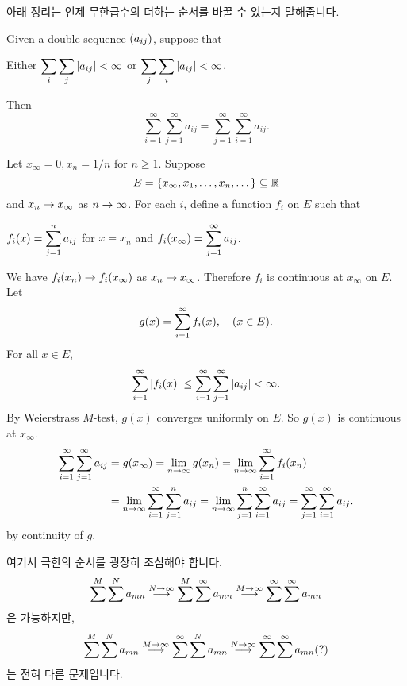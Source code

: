 \pagebreak

아래 정리는 언제 무한급수의 더하는 순서를 바꿀 수 있는지 말해줍니다.

  Given a double sequence \(\left( a_{ij} \right)\), suppose that
\begin{center}
    Either \(\displaystyle \sum_{i} \sum_{j} \left| a_{ij} \right| < \infty\) or \(\displaystyle \sum_{j} \sum_{i} \left| a_{ij} \right| < \infty\).
\end{center}
Then
\[
    \sum_{i=1}^\infty \sum_{j=1}^\infty a_{ij} = \sum_{j=1}^\infty \sum_{i=1}^\infty a_{ij}.
\]

\pf Let \(x_\infty = 0, x_n = 1/n\) for \(n \geq 1\). Suppose
\[
    E = \{x_\infty, x_1, \dots, x_n, \dots\} \subseteq \mathbb{R}
\]
and \(x_n \rightarrow x_\infty\) as \(n \rightarrow \infty\). For each \(i\), define a function \(f_i\) on \(E\) such that
\begin{center}
    \(f_i(x) = \displaystyle \sum_{j=1}^n a_{ij} \) for \(x = x_n\) \quad and \quad \(f_i(x_\infty) = \displaystyle \sum_{j=1}^\infty a_{ij}\).
\end{center}
We have \(f_i(x_n) \rightarrow f_i(x_\infty)\) as \(x_n \rightarrow x_\infty\). Therefore \(f_i\) is continuous at \(x_\infty\) on \(E\).
Let
\[
    g(x) = \displaystyle \sum_{i=1}^\infty f_i(x), \quad (x\in E).
\]
For all \(x \in E\),
\[
    \sum_{i=1}^\infty \left| f_i(x) \right| \leq \sum_{i=1}^\infty \sum_{j=1}^\infty \left| a_{ij} \right| < \infty.
\]
By Weierstrass \(M\)-test, \(g(x)\) converges uniformly on \(E\). So \(g(x)\) is continuous at \(x_\infty\).
\[
    \begin{aligned}
        \sum_{i=1}^\infty \sum_{j=1}^\infty a_{ij} & = g(x_\infty) = \lim_{n\rightarrow\infty} g(x_n) = \lim_{n \rightarrow\infty} \sum_{i=1}^\infty f_i(x_n)                                                                          \\
                                                   & = \lim_{n\rightarrow\infty} \sum_{i=1}^\infty \sum_{j=1}^n a_{ij} = \lim_{n\rightarrow\infty} \sum_{j=1}^n \sum_{i=1}^\infty a_{ij} = \sum_{j=1}^\infty \sum_{i=1}^\infty a_{ij}.
    \end{aligned}
\]
by continuity of \(g\).

여기서 극한의 순서를 굉장히 조심해야 합니다.
\[
    \sum^M \sum^N a_{mn} \overset{N \rightarrow \infty}{\longrightarrow} \sum^M \sum^\infty a_{mn} \overset{M \rightarrow \infty}{\longrightarrow} \sum^\infty \sum^\infty a_{mn}
\]
은 가능하지만,
\[
    \sum^M \sum^N a_{mn} \overset{M \rightarrow \infty}{\longrightarrow} \sum^\infty \sum^N a_{mn} \overset{N \rightarrow \infty}{\longrightarrow} \sum^\infty \sum^\infty a_{mn} (?)
\]
는 전혀 다른 문제입니다.

